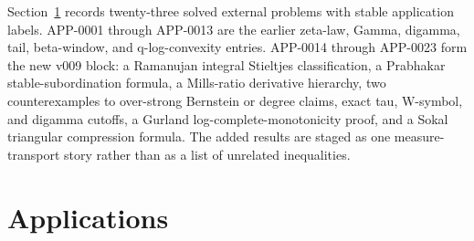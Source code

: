\documentclass[11pt]{article}
\numberwithin{equation}{section}
\theoremstyle{definition}
\theoremstyle{remark}
\newcommand{\1}{\mathbf 1}
\begin{document}
Section~\ref{sec:applications} records twenty-three solved external problems with stable application labels.  APP-0001 through APP-0013 are the earlier zeta-law, Gamma, digamma, tail, beta-window, and q-log-convexity entries.  APP-0014 through APP-0023 form the new v009 block: a Ramanujan integral Stieltjes classification, a Prabhakar stable-subordination formula, a Mills-ratio derivative hierarchy, two counterexamples to over-strong Bernstein or degree claims, exact tau, W-symbol, and digamma cutoffs, a Gurland log-complete-monotonicity proof, and a Sokal triangular compression formula.  The added results are staged as one measure-transport story rather than as a list of unrelated inequalities.

\section{Applications}
\label{sec:applications}
\end{document}
